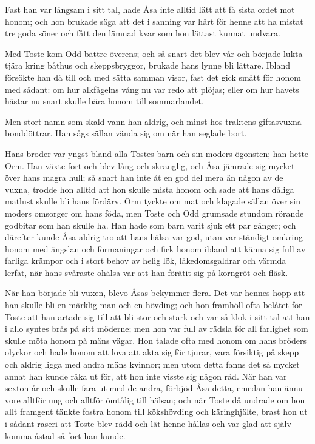 \initial Fast han var långsam i sitt tal, hade Åsa inte alltid lätt att få sista ordet mot honom; och hon brukade säga att det i sanning var hårt för henne att ha mistat tre goda söner och fått den lämnad kvar som hon lättast kunnat undvara.

\initial Med Toste kom Odd bättre överens; och så snart det blev vår och började lukta tjära kring båthus och skeppsbryggor, brukade hans lynne bli lättare. Ibland försökte han då till och med sätta samman visor, fast det gick smått för honom med sådant: om hur alkfågelns vång nu var redo att plöjas; eller om hur havets hästar nu snart skulle bära honom till sommarlandet.

\initial Men stort namn som skald vann han aldrig, och minst hos traktens giftasvuxna bonddöttrar. Han sågs sällan vända sig om när han seglade bort.

\initial Hans broder var yngst bland alla Tostes barn och sin moders ögonsten; han hette Orm. Han växte fort och blev lång och skranglig, och Åsa jämrade sig mycket över hans magra hull; så snart han inte åt en god del mera än någon av de vuxna, trodde hon alltid att hon skulle mista honom och sade att hans dåliga matlust skulle bli hans fördärv. Orm tyckte om mat och klagade sällan över sin moders omsorger om hans föda, men Toste och Odd grumsade stundom rörande godbitar som han skulle ha. Han hade som barn varit sjuk ett par gånger; och därefter kunde Åsa aldrig tro att hans hälsa var god, utan var ständigt omkring honom med ängslan och förmaningar och fick honom ibland att känna sig full av farliga krämpor och i stort behov av helig lök, läkedomsgaldrar och värmda lerfat, när hans svåraste ohälsa var att han förätit sig på korngröt och fläsk.

\initial När han började bli vuxen, blevo Åsas bekymmer flera. Det var hennes hopp att han skulle bli en märklig man och en hövding; och hon framhöll ofta belåtet för Toste att han artade sig till att bli stor och stark och var så klok i sitt tal att han i allo syntes brås på sitt möderne; men hon var full av rädsla för all farlighet som skulle möta honom på mäns vägar. Hon talade ofta med honom om hans bröders olyckor och hade honom att lova att akta sig för tjurar, vara försiktig på skepp och aldrig ligga med andra mäns kvinnor; men utom detta fanns det så mycket annat han kunde råka ut för, att hon inte visste sig någon råd. När han var sexton år och skulle fara ut med de andra, förbjöd Åsa detta, emedan han ännu vore alltför ung och alltför ömtålig till hälsan; och när Toste då undrade om hon allt framgent tänkte fostra honom till kökshövding och käringhjälte, brast hon ut i sådant raseri att Toste blev rädd och lät henne hållas och var glad att själv komma åstad så fort han kunde.

